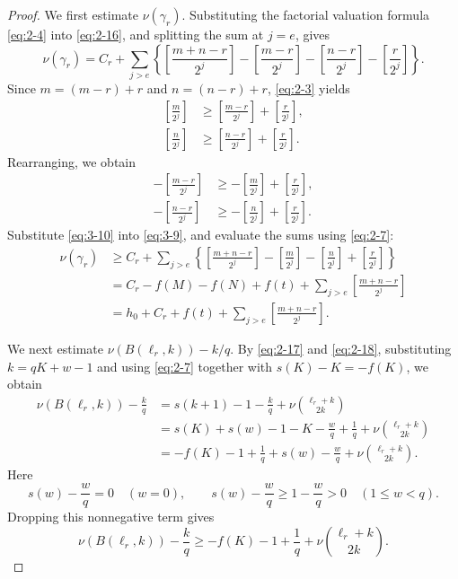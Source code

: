 \documentclass[11pt,a4paper]{article}
\numberwithin{equation}{section}
\theoremstyle{definition}
\begin{document}
\begin{proof}
We first estimate $\nu(\gamma_r)$. Substituting the factorial valuation formula \eqref{eq:2-4} into \eqref{eq:2-16}, and splitting the sum at $j=e$, gives
\begin{equation}
\nu(\gamma_r)=C_r+\sum_{j>e}\left\{
\left[\frac{m+n-r}{2^j}\right]
-\left[\frac{m-r}{2^j}\right]
-\left[\frac{n-r}{2^j}\right]
-\left[\frac r{2^j}\right]\right\}.
\label{eq:3-9}
\end{equation}
Since $m=(m-r)+r$ and $n=(n-r)+r$, \eqref{eq:2-3} yields
\[
\begin{aligned}
\left[\frac m{2^j}\right]&\ge\left[\frac{m-r}{2^j}\right]+\left[\frac r{2^j}\right],\\
\left[\frac n{2^j}\right]&\ge\left[\frac{n-r}{2^j}\right]+\left[\frac r{2^j}\right].
\end{aligned}
\]
Rearranging, we obtain
\begin{equation}
\begin{aligned}
-\left[\frac{m-r}{2^j}\right]&\ge-\left[\frac m{2^j}\right]+\left[\frac r{2^j}\right],\\
-\left[\frac{n-r}{2^j}\right]&\ge-\left[\frac n{2^j}\right]+\left[\frac r{2^j}\right].
\end{aligned}
\label{eq:3-10}
\end{equation}
Substitute \eqref{eq:3-10} into \eqref{eq:3-9}, and evaluate the sums using \eqref{eq:2-7}:
\begin{equation}
\begin{aligned}
\nu(\gamma_r)
&\ge C_r+\sum_{j>e}\left\{
\left[\frac{m+n-r}{2^j}\right]-\left[\frac m{2^j}\right]
-\left[\frac n{2^j}\right]+\left[\frac r{2^j}\right]\right\}\\
&=C_r-f(M)-f(N)+f(t)+\sum_{j>e}\left[\frac{m+n-r}{2^j}\right]\\
&=h_0+C_r+f(t)+\sum_{j>e}\left[\frac{m+n-r}{2^j}\right].
\end{aligned}
\label{eq:3-11}
\end{equation}

We next estimate $\nu(B(\ell_r,k))-k/q$. By \eqref{eq:2-17} and \eqref{eq:2-18}, substituting $k=qK+w-1$ and using \eqref{eq:2-7} together with $s(K)-K=-f(K)$, we obtain
\[
\begin{aligned}
\nu(B(\ell_r,k))-\frac{k}{q}
&=s(k+1)-1-\frac{k}{q}+\nu\binom{\ell_r+k}{2k}\\
&=s(K)+s(w)-1-K-\frac{w}{q}+\frac1q+\nu\binom{\ell_r+k}{2k}\\
&=-f(K)-1+\frac1q+s(w)-\frac{w}{q}+\nu\binom{\ell_r+k}{2k}.
\end{aligned}
\]
Here
\[
s(w)-\frac wq=0\quad(w=0),\qquad
s(w)-\frac wq\ge1-\frac wq>0\quad(1\le w<q).
\]
Dropping this nonnegative term gives
\begin{equation}
\nu(B(\ell_r,k))-\frac kq
\ge-f(K)-1+\frac1q+\nu\binom{\ell_r+k}{2k}.
\label{eq:3-12}
\end{equation}


\end{proof}
\end{document}
